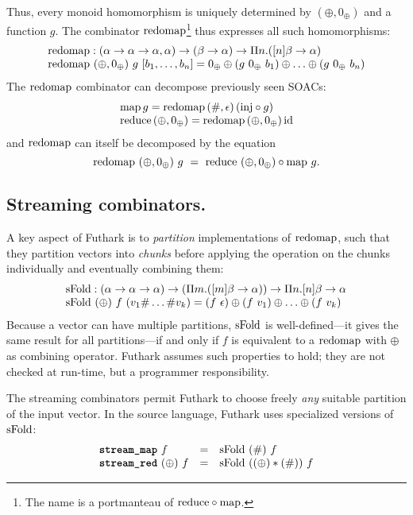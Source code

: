 Thus, every monoid homomorphism is uniquely determined by
$(\oplus,0_{\oplus})$ and a function $g$.  The combinator $\mathrm{redomap}$\footnote{The name is a portmanteau of $\mathrm{reduce} \circ \mathrm{map}$.}
thus expresses all such homomorphisms:
\[ \begin{array}{l}
\mathrm{redomap} : (\alpha \to \alpha \to \alpha, \alpha) \to (\beta \to \alpha) \to \Pi n. ([n]\beta \to \alpha) \\
\mathrm{redomap}~(\oplus, 0_{\oplus})~g~[b_1, \ldots, b_n] = 0_{\oplus} \oplus (g~0_{\oplus}~b_1) \oplus \ldots \oplus (g~0_{\oplus}~b_n)
\end{array} \]
The $\mathrm{redomap}$ combinator can decompose previously seen SOACs:
\[ \begin{array}{l}
\mathrm{map} \, g = \mathrm{redomap}\, (\#, \epsilon)\, (\mathrm{inj} \circ g) \\
\mathrm{reduce}\, (\oplus, 0_{\oplus}) = \mathrm{redomap}\, (\oplus, 0_{\oplus})\, \mathrm{id}
\end{array} \]
and $\mathrm{redomap}$ can itself be decomposed by the equation
\[
  \mathrm{redomap} ~ (\oplus,0_{\oplus}) ~ g ~ = ~ \mathrm{reduce} ~ (\oplus,0_{\oplus}) \circ \mathrm{map} ~ g.
\]

\subsection{Streaming combinators.}

A key aspect of Futhark is to \emph{partition} implementations of
$\mathrm{redomap}$, such that they partition vectors into \emph{chunks}
before applying the operation on the chunks individually and
eventually combining them:
\[ \begin{array}{l}
\mathrm{sFold} : (\alpha \to \alpha \to \alpha) \to (\Pi m. ([m]\beta \to \alpha)) \to \Pi n. [n]\beta \to \alpha \\
\mathrm{sFold}~(\oplus)~f~(v_1 \# \ldots \# v_k) = (f~\epsilon) \oplus (f~v_1) \oplus \ldots \oplus (f~v_k) \\
\end{array} \]
%
Because a vector can have multiple partitions, $\mathrm{sFold}$ is
well-defined---it gives the same result for all partitions---if and
only if $f$ is equivalent to a $\mathrm{redomap}$ with $\oplus$ as combining
operator.  Futhark assumes such properties to hold; they are not
checked at run-time, but a programmer responsibility.

The streaming combinators permit Futhark to choose freely \emph{any}
suitable partition of the input vector.  In the source language, Futhark uses specialized
versions of $\mathrm{sFold}$:
\[
  \begin{array}{lcl}
    \mbox{\texttt{\bfseries{stream\_map}}}~f & = &  \mathrm{sFold}~(\#)~f \\
    \mbox{\texttt{\bfseries{stream\_red}}}~(\oplus)~f & = & \mathrm{sFold}~((\oplus) * (\#))~f
  \end{array}
\]

